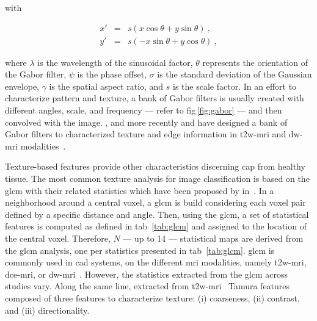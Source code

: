 \noindent with 

\begin{eqnarray}
	x' & = & s\left( x \cos \theta + y \sin \theta \right) \ , \nonumber \\
	y' & = & s \left( - x \sin \theta + y \cos \theta \right) \ , \nonumber
\end{eqnarray}

\noindent where $\lambda$ is the wavelength of the sinusoidal factor, $\theta$ represents the orientation of the Gabor filter, $\psi$ is the phase offset, $\sigma$ is the standard deviation of the Gaussian envelope, $\gamma$ is the spatial aspect ratio, and $s$ is the scale factor.
In an effort to characterize pattern and texture, a bank of Gabor filters is usually created with different angles, scale, and frequency --- refer to \acs{fig}\,\ref{fig:gabor} --- and then convolved with the image.
\citeauthor{Viswanath2012}, \citeauthor{Tiwari2012} and more recently \citeauthor{khalvati2015automated} and \citeauthor{chung2015prostate} have designed a bank of Gabor filters to characterized texture and edge information in \ac{t2w}-\ac{mri} and \ac{dw}-\ac{mri} modalities~\cite{Viswanath2012,Tiwari2012,khalvati2015automated,chung2015prostate}.

Texture-based features provide other characteristics discerning \ac{cap} from healthy tissue.
The most common texture analysis for image classification is based on the \ac{glcm} with their related statistics which have been proposed by \citeauthor{Haralick1973} in~\cite{Haralick1973}.
In a neighborhood around a central voxel, a \ac{glcm} is build considering each voxel pair defined by a specific distance and angle.
Then, using the \ac{glcm}, a set of statistical features is computed as defined in \acs{tab}~\ref{tab:glcm} and assigned to the location of the central voxel.
Therefore, $N$ --- up to 14 --- statistical maps are derived from the \ac{glcm} analysis, one per statistics presented in \acs{tab}~\ref{tab:glcm}.
\ac{glcm} is commonly used in \ac{cad} systems, on the different \ac{mri} modalities, namely \ac{t2w}-\ac{mri}, \ac{dce}-\ac{mri}, or \ac{dw}-\ac{mri}~\cite{Antic2013,Niaf2011,Niaf2012,Tiwari2009a,Tiwari2010,Tiwari2013,Viswanath2008,Viswanath2009,Viswanath2011,Viswanath2012,trigui2016classification,rampun2015computer,rampun2016computer,rampun2016quantitative,cameron2014multiparametric,cameron2016maps,khalvati2015automated,chung2015prostate,lehaire2014computer}.
However, the statistics extracted from the \ac{glcm} across studies vary.
Along the same line, \citeauthor{rampun2016computer} extracted from \ac{t2w}-\ac{mri}~\cite{rampun2016computer,rampun2015computer} Tamura features~\cite{tamura1978textural} composed of three features to characterize texture: (i) coarseness, (ii) contrast, and (iii) directionality.


